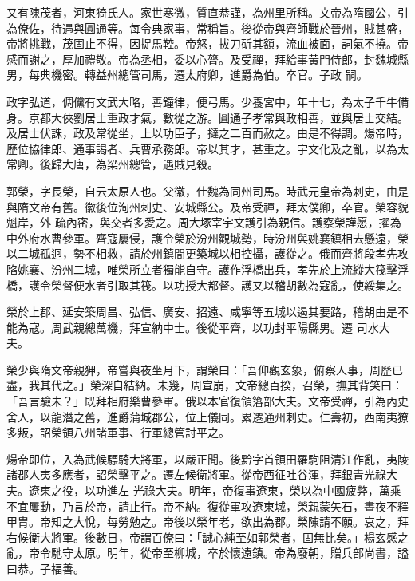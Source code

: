 \begin{pinyinscope}
 又有陳茂者，河東猗氏人。家世寒微，質直恭謹，為州里所稱。文帝為隋國公，引為僚佐，待遇與圓通等。每令典家事，常稱旨。後從帝與齊師戰於晉州，賊甚盛，帝將挑戰，茂固止不得，因捉馬鞚。帝怒，拔刀斫其額，流血被面，詞氣不撓。帝感而謝之，厚加禮敬。帝為丞相，委以心膂。及受禪，拜給事黃門侍郎，封魏城縣男，每典機密。轉益州總管司馬，遷太府卿，進爵為伯。卒官。子政
 嗣。



 政字弘道，倜儻有文武大略，善鐘律，便弓馬。少養宮中，年十七，為太子千牛備身。京都大俠劉居士重政才氣，數從之游。圓通子孝常與政相善，並與居士交結。及居士伏誅，政及常從坐，上以功臣子，撻之二百而赦之。由是不得調。煬帝時，歷位協律郎、通事謁者、兵曹承務郎。帝以其才，甚重之。宇文化及之亂，以為太常卿。後歸大唐，為梁州總管，遇賊見殺。



 郭榮，字長榮，自云太原人也。父徽，仕魏為同州司馬。時武元皇帝為刺史，由是與隋文帝有舊。徽後位洵州刺史、安城縣公。及帝受禪，拜太僕卿，卒官。榮容貌魁岸，外
 疏內密，與交者多愛之。周大塚宰宇文護引為親信。護察榮謹愿，擢為中外府水曹參軍。齊寇屢侵，護令榮於汾州觀城勢，時汾州與姚襄鎮相去懸遠，榮以二城孤迥，勢不相救，請於州鎮間更築城以相控攝，護從之。俄而齊將段孝先攻陷姚襄、汾州二城，唯榮所立者獨能自守。護作浮橋出兵，孝先於上流縱大筏擊浮橋，護令榮督便水者引取其筏。以功授大都督。護又以稽胡數為寇亂，使綏集之。



 榮於上郡、延安築周昌、弘信、廣安、招遠、咸寧等五城以遏其要路，稽胡由是不能為寇。周武親總萬機，拜宣納中士。後從平齊，以功封平陽縣男。遷
 司水大夫。



 榮少與隋文帝親狎，帝嘗與夜坐月下，謂榮曰：「吾仰觀玄象，俯察人事，周歷已盡，我其代之。」榮深自結納。未幾，周宣崩，文帝總百揆，召榮，撫其背笑曰：「吾言驗未？」既拜相府樂曹參軍。俄以本官復領籓部大夫。文帝受禪，引為內史舍人，以龍潛之舊，進爵蒲城郡公，位上儀同。累遷通州刺史。仁壽初，西南夷獠多叛，詔榮領八州諸軍事、行軍總管討平之。



 煬帝即位，入為武候驃騎大將軍，以嚴正聞。後黔字首領田羅駒阻清江作亂，夷陵諸郡人夷多應者，詔榮擊平之。遷左候衛將軍。從帝西征吐谷渾，拜銀青光祿大夫。遼東之役，以功進左
 光祿大夫。明年，帝復事遼東，榮以為中國疲弊，萬乘不宜屢動，乃言於帝，請止行。帝不納。復從軍攻遼東城，榮親蒙矢石，晝夜不釋甲胄。帝知之大悅，每勞勉之。帝後以榮年老，欲出為郡。榮陳請不願。哀之，拜右候衛大將軍。後數日，帝謂百僚曰：「誠心純至如郭榮者，固無比矣。」楊玄感之亂，帝令馳守太原。明年，從帝至柳城，卒於懷遠鎮。帝為廢朝，贈兵部尚書，謚曰恭。子福善。




\end{pinyinscope}
